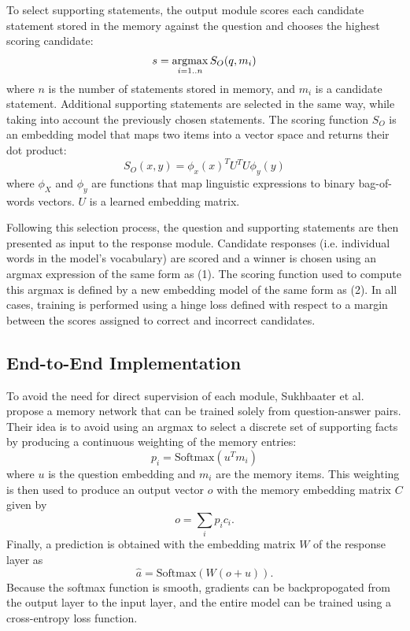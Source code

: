 \documentclass[10pt]{article}
\newcommand{\argmax}{\operatornamewithlimits{argmax}}
\begin{document}
To select supporting statements, the output module scores each candidate statement stored in the memory against the question and chooses the highest scoring candidate:
\begin{equation}
s= \argmax_{i=1..n} S_O(q,m_i)  
\end{equation}
where $n$ is the number of statements stored in memory, and $m_i$ is a candidate 
statement. Additional supporting statements are selected in the same way, while 
taking into account the previously chosen statements. The scoring function $S_O$ 
is an embedding model that maps two items into a vector space and returns their 
dot product:
\begin{equation}
S_O(x,y)= \phi_x(x)^T U^T U \phi_y(y)  
\end{equation}
where $\phi_X$ and $\phi_y$ are functions that map linguistic expressions to 
binary bag-of-words vectors. $U$ is a learned embedding matrix. 

Following this selection process, the question and supporting statements are 
then presented as input to the response module. Candidate responses (i.e. 
individual words in the model's vocabulary) are scored and a winner is chosen 
using an argmax expression of the same form as (1). The scoring function used to 
compute this argmax is defined by a new embedding model of the same form as (2).  
In all cases, training is performed using a hinge loss defined with respect to 
a margin between the scores assigned to correct and incorrect candidates. 

\subsection{End-to-End Implementation}

To avoid the need for direct supervision of each module, Sukhbaater et al. \cite{Sukhbaatar:2015} propose a memory network that can be trained solely from question-answer pairs. Their idea is to avoid using an argmax to select a discrete set of supporting facts by producing a continuous weighting of the memory entries:
\begin{equation}
    p_i = \mathrm{Softmax}(u^Tm_i)
\end{equation}
where $u$ is the question embedding and $m_i$ are the memory items.
This weighting is then used to produce an output vector $o$ with the memory 
embedding matrix $C$ given by
\begin{equation}
    o = \sum_i p_i c_i \text{.}
\end{equation}
Finally, a prediction is obtained with the embedding matrix $W$ of the response layer as
\begin{equation}
    \hat a = \mathrm{Softmax}(W(o+u)) \text{.}
\end{equation}
Because the softmax function is smooth, gradients can be backpropogated from the output layer to the input layer, and the entire model can be trained using a cross-entropy loss function. 
\end{document}
